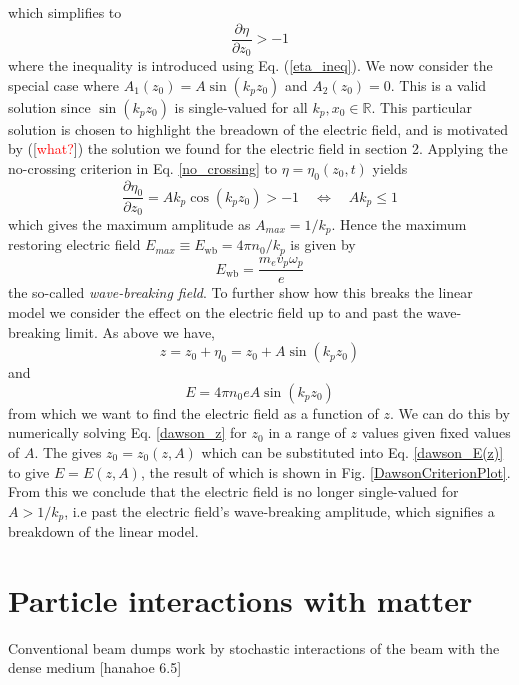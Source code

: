 \documentclass[%
onecolumn, notitlepage,
 amsmath,amssymb,
 aps,
]{article}
\begin{document}
which simplifies to
\begin{equation}
\frac{\partial \eta}{\partial z_0}>-1
\label{no_crossing}
\end{equation}
where the inequality is introduced using Eq. (\ref{eta_ineq}). We now consider the special case where $A_1(z_0)=A\sin(k_pz_0)$ and $A_2(z_0)=0$. This is a valid solution since $\sin(k_pz_0)$ is single-valued for all $k_p,x_0\in\mathbb{R}$. This particular solution is chosen to highlight the breadown of the electric field, and is motivated by ([\textcolor{red}{what?}]) the solution we found for the electric field in section 2. Applying the no-crossing criterion in Eq. \ref{no_crossing} to $\eta=\eta_0(z_0,t)$ yields
\begin{equation}
\frac{\partial \eta_0}{\partial z_0}=Ak_p\cos(k_pz_0)>-1 \quad \Leftrightarrow \quad Ak_p\leq 1
\end{equation}
which gives the maximum amplitude as $A_{max}=1/k_p$. Hence the maximum restoring electric field $E_{max}\equiv E_{\text{wb}}=4\pi n_0/k_p$ is given by
\begin{equation}
E_{\text{wb}}=\frac{m_ev_p\omega_p}{e}
\end{equation}
the so-called \textit{wave-breaking field}. To further show how this breaks the linear model we consider the effect on the electric field up to and past the wave-breaking limit. As above we have, 
\begin{equation}
z=z_0+\eta_0=z_0+A\sin(k_p z_0)
\label{dawson_z}
\end{equation}
and 
\begin{equation}
E=4\pi n_0e A\sin(k_p z_0)
\label{dawson_E(z)}
\end{equation}
from which we want to find the electric field as a function of $z$. We can do this by numerically solving Eq. \ref{dawson_z} for $z_0$ in a range of $z$ values given fixed values of $A$. The gives $z_0=z_0(z,A)$ which can be substituted into Eq. \ref{dawson_E(z)} to give $E=E(z,A)$, the result of which is shown in Fig. \ref{DawsonCriterionPlot}. From this we conclude that the electric field is no longer single-valued for $A>1/k_p$, i.e past the electric field's wave-breaking amplitude, which signifies a breakdown of the linear model.

\clearpage
\section{Particle interactions with matter}
Conventional beam dumps work by stochastic interactions of the beam with the dense medium [hanahoe 6.5]
\end{document}
